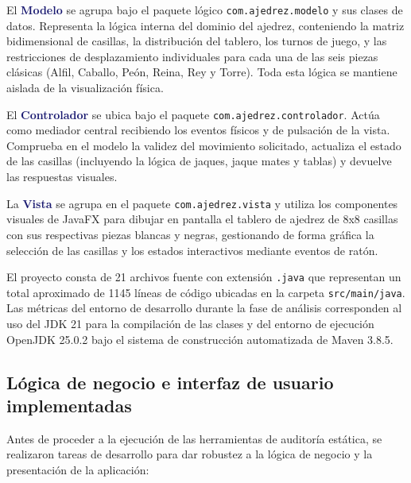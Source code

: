 \documentclass[12pt,a4paper]{article}
\newcommand{\key}[1]{\textbf{\textcolor{MidnightBlue}{#1}}}
\begin{document}
El \key{Modelo} se agrupa bajo el paquete lógico \texttt{com.ajedrez.modelo} y sus clases de datos. Representa la lógica interna del dominio del ajedrez, conteniendo la matriz bidimensional de casillas, la distribución del tablero, los turnos de juego, y las restricciones de desplazamiento individuales para cada una de las seis piezas clásicas (Alfil, Caballo, Peón, Reina, Rey y Torre). Toda esta lógica se mantiene aislada de la visualización física.

El \key{Controlador} se ubica bajo el paquete \texttt{com.ajedrez.controlador}. Actúa como mediador central recibiendo los eventos físicos y de pulsación de la vista. Comprueba en el modelo la validez del movimiento solicitado, actualiza el estado de las casillas (incluyendo la lógica de jaques, jaque mates y tablas) y devuelve las respuestas visuales.

La \key{Vista} se agrupa en el paquete \texttt{com.ajedrez.vista} y utiliza los componentes visuales de JavaFX para dibujar en pantalla el tablero de ajedrez de 8x8 casillas con sus respectivas piezas blancas y negras, gestionando de forma gráfica la selección de las casillas y los estados interactivos mediante eventos de ratón.

El proyecto consta de 21 archivos fuente con extensión \texttt{.java} que representan un total aproximado de 1145 líneas de código ubicadas en la carpeta \texttt{src/main/java}. Las métricas del entorno de desarrollo durante la fase de análisis corresponden al uso del JDK 21 para la compilación de las clases y del entorno de ejecución OpenJDK 25.0.2 bajo el sistema de construcción automatizada de Maven 3.8.5.

\subsection{Lógica de negocio e interfaz de usuario implementadas}

Antes de proceder a la ejecución de las herramientas de auditoría estática, se realizaron tareas de desarrollo para dar robustez a la lógica de negocio y la presentación de la aplicación:
\end{document}
